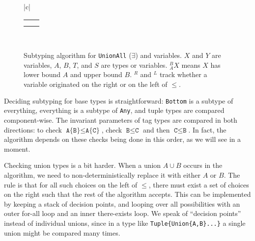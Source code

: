 \begin{figure}[!t]
\begin{center}
\begin{tabular}{|c|}
\begin{tabular}{cc}
        \\[8pt]

        \AxiomC{$^BX^L,{} _AY^L,\Gamma\ \vdash\ B \leq Y\ \vee\ X \leq A$}
        \UnaryInfC{$^BX^L,{} _AY^L,\Gamma\ \vdash\ X \leq Y$}
        \DisplayProof

        \hspace{4ex}

        &

        \AxiomC{$_A^BX^R,{} Y^R,\Gamma\ \vdash\ B \leq A$}
        \UnaryInfC{$_A^BX^R,{} Y^R,\Gamma\ \vdash\ X \leq Y$}
        \DisplayProof

        \\[8pt]

        \AxiomC{$_A^BX^R,\Gamma\ \vdash\ A \leq T$}
        \UnaryInfC{$_A^TX^R,\Gamma\ \vdash\ X \leq T$}
        \DisplayProof

        \hspace{4ex}

        &

        \AxiomC{$_A^BX^R,\Gamma\ \vdash\ T \leq B$}
        \UnaryInfC{$_{A \cup T}^{\ \ \ B}X^R,\Gamma\ \vdash\ T \leq X$}
        \DisplayProof

        \\[8pt]
      \end{tabular}
      \\
      \hline
    \end{tabular}
  \end{center}
  \caption{
\small{
    Subtyping algorithm for \texttt{UnionAll} ($\exists$) and variables.
    $X$ and $Y$ are variables, $A$, $B$, $T$, and $S$ are types or variables.
    $_A^BX$ means $X$ has lower bound $A$ and upper bound $B$.
    $^R$ and $^L$ track whether a variable originated on the right or on the left of
    $\leq$.
}
  }
  \label{subtvars}
\end{figure}


Deciding subtyping for base types is straightforward: \texttt{Bottom} is
a subtype of everything, everything is a subtype of \texttt{Any}, and
tuple types are compared component-wise. The invariant parameters
of tag types are compared in both directions: to check
$\texttt{A\{B\}}\leq \texttt{A\{C\}}$, check $\texttt{B}\leq\texttt{C}$ and
then $\texttt{C}\leq\texttt{B}$. In fact, the algorithm depends on these
checks being done in this order, as we will see in a moment.

Checking union types is a bit harder. When a union $A\cup B$ occurs in the
algorithm, we need to non-deterministically replace it with either $A$ or
$B$. The rule is that for all such choices on the left of $\leq$, there
must exist a set of choices on the right such that the rest of the
algorithm accepts. This can be implemented by keeping a stack of
decision points, and looping over all possibilities with an outer
for-all loop and an inner there-exists loop. We speak of ``decision points''
instead of individual unions, since in a type like \texttt{Tuple\{Union\{A,B\}...\}}
a single union might be compared many times.

